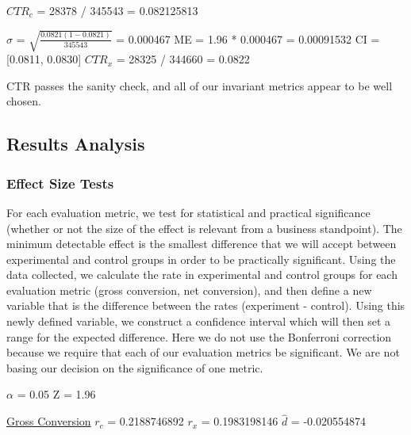 \documentclass[paper=a4, fontsize=11pt]{scrartcl} %
\numberwithin{equation}{section} %
\numberwithin{figure}{section} %
\numberwithin{table}{section} %
\begin{document}
$CTR_{c}$ = 28378 / 345543 = 0.082125813

$\sigma$ = $\sqrt{\frac{0.0821(1-0.0821)}{345543}}$ = 0.000467
\newline
ME = 1.96 * 0.000467 = 0.00091532
\newline
CI = [0.0811, 0.0830]
\newline
$CTR_{x}$ = 28325 / 344660 = 0.0822
\newline

CTR passes the sanity check, and all of our invariant metrics appear to be well chosen. \newline


\subsection{Results Analysis}

\subsubsection{Effect Size Tests}

For each evaluation metric, we test for statistical and practical significance (whether or not the size of the effect is relevant from a business standpoint).  The minimum detectable effect is the smallest difference that we will accept between experimental and control groups in order to be practically significant.  Using the data collected, we calculate the rate in experimental and control groups for each evaluation metric (gross conversion, net conversion), and then define a new variable that is the difference between the rates (experiment - control).  Using this newly defined variable, we construct a confidence interval which will then set a range for the expected difference.  Here we do not use the Bonferroni correction because we require that each of our evaluation metrics be significant.  We are not basing our decision on the significance of one metric.  \newline

$\alpha$ = 0.05
\newline
Z = 1.96
\newline
\newline

\underline{Gross Conversion} \newline
\newline
$r_{c}$ = 0.2188746892
\newline
$r_{x}$ = 0.1983198146
\newline
$\widehat{d}$ = -0.020554874
\newline
\end{document}
